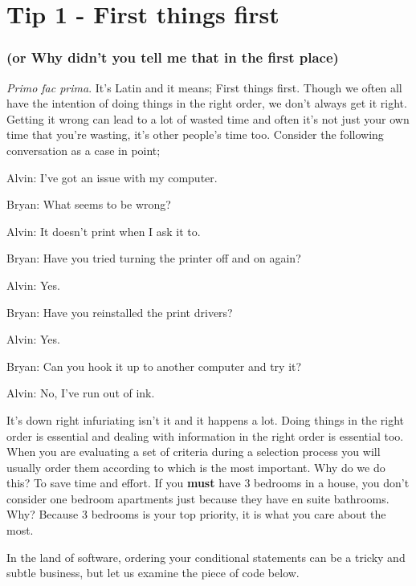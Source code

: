\chapter{Tip 1 - First things first}
\subsection{(or Why didn't you tell me that in the first place)}

\textit{Primo fac prima}. It's Latin and it means; First things first. 
Though we often all have the intention of doing things in the right order, we don't always get it right.
Getting it wrong can lead to a lot of wasted time and often it's not just your own time that you're wasting, it's other people's time too.
Consider the following conversation as a case in point;

\begin{trenches}
Alvin: I've got an issue with my computer.

Bryan: What seems to be wrong?

Alvin: It doesn't print when I ask it to.

Bryan: Have you tried turning the printer off and on again?

Alvin: Yes.

Bryan: Have you reinstalled the print drivers?

Alvin: Yes.

Bryan: Can you hook it up to another computer and try it?

Alvin: No, I've run out of ink.
\end{trenches}

It's down right infuriating isn't it and it happens a lot.
Doing things in the right order is essential and dealing with information in the right order is essential too.
When you are evaluating a set of criteria during a selection process you will usually order them according to which is the most important.
Why do we do this? To save time and effort. 
If you \textbf{must} have 3 bedrooms in a house, you don't consider one bedroom apartments just because they have en suite bathrooms.
Why? Because 3 bedrooms is your top priority, it is what you care about the most.

In the land of software, ordering your conditional statements can be a tricky and subtle business, but let us examine the piece of code below.

